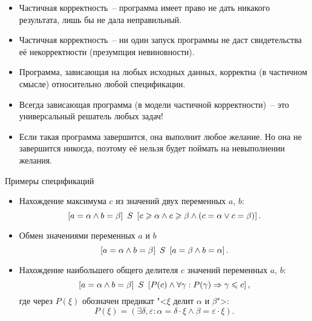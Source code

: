 \documentclass[landscape]{slides}
\begin{document}
\begin{slide}
        \begin{itemize}
                \item Частичная корректность~-- программа имеет право не дать
                        никакого результата, лишь бы не дала неправильный.
                \item Частичная корректность~-- ни один запуск программы не даст свидетельства
                        её некорректности (презумпция невиновности).
                \item Программа, зависающая на любых исходных данных, корректна (в частичном смысле)
                        относительно любой спецификации.
                \item Всегда зависающая программа (в модели частичной корректности)~-- это универсальный
                        решатель любых задач!
                \item Если такая программа завершится, она выполнит любое желание. Но она не завершится
                        никогда, поэтому её нельзя будет поймать на невыполнении желания.
        \end{itemize}
\end{slide}

\begin{slide}
Примеры спецификаций
\begin{itemize}
\item Нахождение максимума $c$ из значений двух переменных $a$, $b$:
        \[
                \left[ a = \alpha \land b = \beta \right] \ {S} \ \left[ 
                                c \geqslant \alpha \land
                                c \geqslant \beta \land
                                (c = \alpha \lor c = \beta)
                         \right] .
        \]
\item Обмен значениями переменных $a$ и $b$
        \[
                \left[ a = \alpha \land b = \beta \right] \ {S} \ \left[ a = \beta \land b = \alpha \right] .
        \]
\item Нахождение наибольшего общего делителя $c$ значений переменных $a$, $b$:
        \[
                \left[ a = \alpha \land b = \beta \right] \ {S} \ \left[ 
                                P(c) \land
                                \forall \gamma : P(\gamma) \Rightarrow \gamma \leqslant c
                         \right] ,
        \]
        где через $P(\xi)$ обозначен предикат "<$\xi$ делит $\alpha$ и $\beta$">:
        \[
                P(\xi) = (\exists \delta, \varepsilon : \alpha = \delta\cdot \xi \land \beta = \varepsilon\cdot \xi).
        \]
\end{itemize}
\end{slide}
\end{document}
